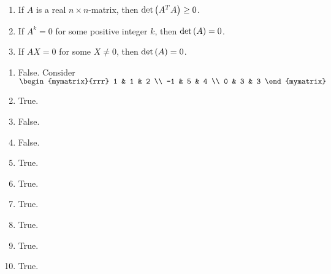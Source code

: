 \begin{enumialphparenastyle}
\begin{ex}
\begin{enumerate}
\item If $A$ is a real $n\times n$-matrix, then $\det \left(A^{T}A\right)
\geq 0$.

\item If $A^{k}=0$ for some positive integer $k$, then $\det \left(
A\right) =0$.

\item If $AX=0$ for some $X \neq 0$, then $\det \left(
A\right) =0$.
\end{enumerate}
\begin{sol}
\begin{enumerate}
\item False. Consider $\begin{mymatrix}{rrr}
1 & 1 & 2 \\
-1 & 5 & 4 \\
0 & 3 & 3
\end{mymatrix} $
\item True.
\item False.
\item False.
\item True.
\item True.
\item True.
\item True.
\item True.
\item True.
\end{enumerate}
\end{sol}
\end{ex}

\end{enumialphparenastyle}
